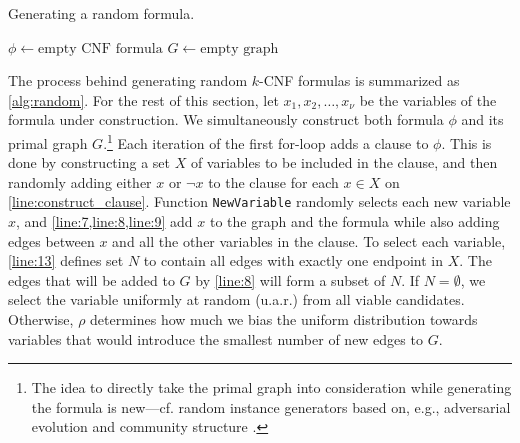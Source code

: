 \begin{algorithm}[t]
  \caption{Generating a random formula.}\label{alg:random}
  $\phi \gets \text{empty CNF formula}$\;
  $G \gets \text{empty graph}$\;
  \Return{$\phi$}\;
\end{algorithm}

The process behind generating random $k$-CNF formulas is summarized as
\cref{alg:random}. For the rest of this section, let $x_1, x_2, \dots, x_\nu$ be
the variables of the formula under construction. We simultaneously construct
both formula $\phi$ and its primal graph $G$.\footnote{The idea to directly take
  the primal graph into consideration while generating the formula is new---cf.
  random \SAT{} instance generators based on, e.g., adversarial evolution
  \citep{DBLP:conf/cec/HossainALA10} and community structure
  \citep{DBLP:journals/ai/Giraldez-CruL16}.} Each iteration of the first for-loop
adds a clause to $\phi$. This is done by constructing a set $X$ of variables to
be included in the clause, and then randomly adding either $x$ or $\neg x$ to
the clause for each $x \in X$ on \cref{line:construct_clause}. Function
\texttt{NewVariable} randomly selects each new variable $x$, and
\cref{line:7,line:8,line:9} add $x$ to the graph and the formula while also
adding edges between $x$ and all the other variables in the clause. To select
each variable, \cref{line:13} defines set $N$ to contain all edges with exactly
one endpoint in $X$. The edges that will be added to $G$ by \cref{line:8} will
form a subset of $N$. If $N = \emptyset$, we select the variable uniformly at
random (u.a.r.) from all viable candidates. Otherwise, $\rho$ determines how
much we bias the uniform distribution towards variables that would introduce the
smallest number of new edges to $G$.

